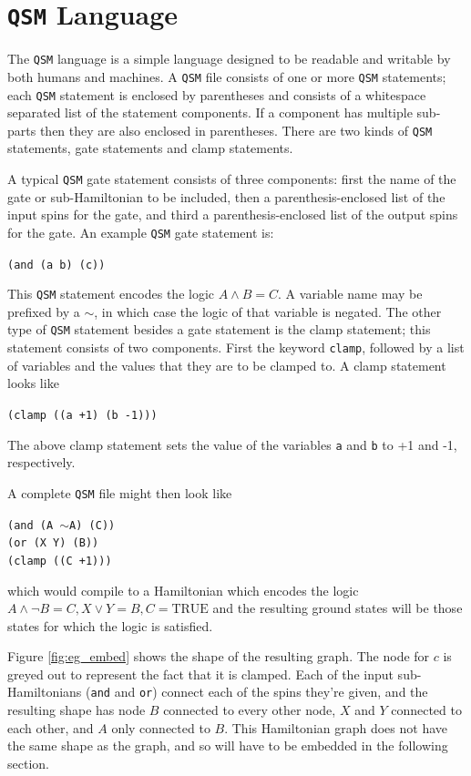 \section{\texttt{QSM} Language}
The \texttt{QSM} language is a simple language designed to be readable and writable by both humans and machines.  A \texttt{QSM} file consists of one or more \texttt{QSM} statements; each \texttt{QSM} statement is enclosed by parentheses and consists of a whitespace separated list of the statement components.  If a component has multiple sub-parts then they are also enclosed in parentheses.  There are two kinds of \texttt{QSM} statements, gate statements and clamp statements.

A typical \texttt{QSM} gate statement consists of three components: first the name of the gate or sub-Hamiltonian to be included, then a parenthesis-enclosed list of the input spins for the gate, and third a parenthesis-enclosed list of the output spins for the gate.  An example \texttt{QSM} gate statement is: 
\begin{center}
	\texttt{(and (a b) (c))}
\end{center}
This \texttt{QSM} statement encodes the logic $A \wedge B = C$.  A variable name may be prefixed by a $\sim$, in which case the logic of that variable is negated.  The other type of \texttt{QSM} statement besides a gate statement is the clamp statement; this statement consists of two components.  First the keyword \texttt{clamp}, followed by a list of variables and the values that they are to be clamped to.  A clamp statement looks like
\begin{center}
	\texttt{(clamp ((a +1) (b -1)))}
\end{center}
The above clamp statement sets the value of the variables \texttt{a} and \texttt{b} to +1 and -1, respectively.

A complete \texttt{QSM} file might then look like

\begin{center}
	\texttt{(and (A $\sim$A) (C))}\\
	\texttt{(or (X Y) (B))}\\
	\texttt{(clamp ((C +1)))}
\end{center}
which would compile to a Hamiltonian which encodes the logic $A \wedge \neg B = C, X \vee Y = B, C = \text{TRUE}$ and the resulting ground states will be those states for which the logic is satisfied.

Figure \ref{fig:eg_embed} shows the shape of the resulting graph.  The node for $c$ is greyed out to represent the fact that it is clamped.  Each of the input sub-Hamiltonians (\texttt{and} and \texttt{or}) connect each of the spins they're given, and the resulting shape has node $B$ connected to every other node, $X$ and $Y$ connected to each other, and $A$ only connected to $B$.  This Hamiltonian graph does not have the same shape as the \machine graph, and so will have to be embedded in the following section.

